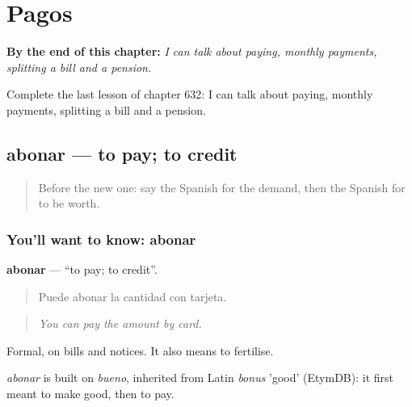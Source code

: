 
\chapter{Pagos}
\label{ch:es-pagos}

\begin{chapteropening}
\textbf{By the end of this chapter:} \emph{I can talk about paying, monthly payments, splitting a bill and a pension.}

Complete the last lesson of chapter 632: I can talk about paying, monthly payments, splitting a bill and a pension.
\end{chapteropening}

\section[abonar]{abonar — to pay; to credit}

\label{lesson:ES-C632-abonar}



\begin{quote}
Before the new one: say the Spanish for the demand, then the Spanish for to be worth.
\end{quote}

\subsection*{You'll want to know: abonar}
\textbf{abonar} — \textquotedblleft{}to pay; to credit\textquotedblright{}.

\begin{quote}
Puede abonar la cantidad con tarjeta.
\end{quote}

\begin{quote}
\emph{You can pay the amount by card.}
\end{quote}

Formal, on bills and notices. It also means to fertilise.

\begin{cousinweb}
\emph{abonar} is built on \emph{bueno}, inherited from Latin \emph{bonus} 'good' (EtymDB): it first meant to make good, then to pay.
\end{cousinweb}

